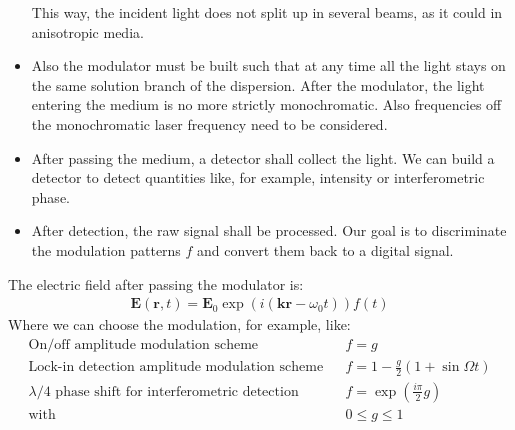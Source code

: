 \documentclass[12pt,a4paper,twoside,openright,BCOR10mm,headsepline,titlepage,abstracton,chapterprefix,final]{scrreprt}
\newcommand\Vector[1]{{\mathbf{#1}}}
\newcommand\Location{\Vector{r}}
\newcommand\wavenumber{k}
\newcommand\Wavevector{\Vector{\wavenumber}}
\newcommand\scalarEfield{E}
\newcommand\Efield{\Vector{\scalarEfield}}
\begin{document}
\begin{itemize}
       This way, the incident light does not split up in several beams, as it could in anisotropic media. 
 \item Also the modulator must be built 
       such that at any time all the light stays on the same solution branch of the dispersion.
       After the modulator, the light entering the medium is no more strictly monochromatic. 
       Also frequencies off the monochromatic laser frequency need to be considered.
 \item After passing the medium, a detector shall collect the light.
       We can build a detector to detect quantities like, for example, 
       intensity or   interferometric phase.
 \item After detection, the raw signal shall be processed.
       Our goal is to discriminate the modulation patterns $f$ and convert them 
       back to a digital signal.
\end{itemize}
The electric field after passing the modulator is:
\begin{eqnarray}
 \Efield(\Location, t) = \Efield_0 \exp (i (\Wavevector \Location - \omega_0 t)) f(t)
\end{eqnarray}
Where we can choose the modulation, for example, like:
\begin{eqnarray}
 \textrm{On/off amplitude modulation scheme}&& f = g\\
 \textrm{Lock-in detection amplitude modulation scheme}&& f = 1 - \frac{g}{2} (1 + \sin{\Omega t}) \\
 \textrm{$\lambda/4$ phase shift for interferometric detection}&& f = \exp\left( \frac{i \pi}{2} g \right) \\
 \textrm{with}&& 0 \leq g \leq 1
\end{eqnarray}
\end{document}
